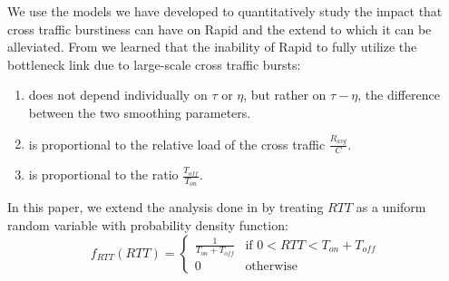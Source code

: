   We use the models we have developed to quantitatively study the impact that 
  cross traffic burstiness can have on Rapid and the extend to which it can 
  be alleviated. From \cite{Lovewell2011-Noise-TR} we learned that the 
  inability of Rapid to fully utilize the bottleneck link due to large-scale 
  cross traffic bursts:
  \begin{enumerate}
    \item does not depend individually on $\tau$ or $\eta$, but rather on 
    $\tau - \eta$, the difference between the two smoothing parameters.

    \item is proportional to the relative load of the cross traffic 
    $\frac{R_{avg}}{C}$.

    \item is proportional to the ratio $\frac{T_{off}}{T_{on}}$.
  \end{enumerate}

  In this paper, we extend the analysis done in \cite{Lovewell2011-Noise-TR} 
  by treating $RTT$ as a uniform random variable with probability density 
  function:
  \begin{equation}
    f_{RTT}(RTT) =
    \begin{cases}
        \frac{1}{T_{on} + T_{off}} & \text{if } 0 < RTT < T_{on} + T_{off} \\
        0 & \text{otherwise}
    \end{cases}
    \label{rttpdf}
  \end{equation}

